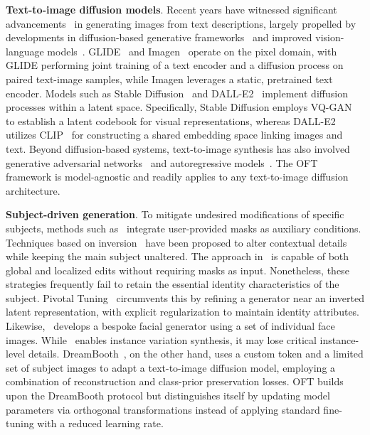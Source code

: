 \textbf{Text-to-image diffusion models}. Recent years have witnessed significant advancements~\cite{saharia2022photorealistic,ramesh2022hierarchical,rombach2022high,gu2022vector,nichol2022glide} in generating images from text descriptions, largely propelled by developments in diffusion-based generative frameworks~\cite{ho2020denoising,song2021score,song2021denoising,dhariwal2021diffusion} and improved vision-language models~\cite{su2020vlbert,lu2019vilbert,radford2021learning,wang2021simvlm,li2022blip,li2023blip,alayrac2022flamingo,schuhmann2022laion}. GLIDE~\cite{nichol2022glide} and Imagen~\cite{saharia2022photorealistic} operate on the pixel domain, with GLIDE performing joint training of a text encoder and a diffusion process on paired text-image samples, while Imagen leverages a static, pretrained text encoder. Models such as Stable Diffusion~\cite{rombach2022high} and DALL-E2~\cite{ramesh2022hierarchical} implement diffusion processes within a latent space. Specifically, Stable Diffusion employs VQ-GAN~\cite{esser2021taming} to establish a latent codebook for visual representations, whereas DALL-E2 utilizes CLIP~\cite{radford2021learning} for constructing a shared embedding space linking images and text. Beyond diffusion-based systems, text-to-image synthesis has also involved generative adversarial networks~\cite{reed2016generative,zhang2017stackgan,xu2018attngan,li2019controllable} and autoregressive models~\cite{ramesh2021zero,ding2021cogview,wu2022nuwa,yuscaling}. The OFT framework is model-agnostic and readily applies to any text-to-image diffusion architecture.

\textbf{Subject-driven generation}. To mitigate undesired modifications of specific subjects, methods such as~\cite{avrahami2022blended,nichol2022glide} integrate user-provided masks as auxiliary conditions. Techniques based on inversion~\cite{choi2021ilvr,dhariwal2021diffusion,ramesh2022hierarchical,gal2022image} have been proposed to alter contextual details while keeping the main subject unaltered. The approach in~\cite{hertz2022prompt} is capable of both global and localized edits without requiring masks as input. Nonetheless, these strategies frequently fail to retain the essential identity characteristics of the subject. Pivotal Tuning~\cite{roich2022pivotal} circumvents this by refining a generator near an inverted latent representation, with explicit regularization to maintain identity attributes. Likewise,~\cite{nitzan2022mystyle} develops a bespoke facial generator using a set of individual face images. While~\cite{casanova2021instance} enables instance variation synthesis, it may lose critical instance-level details. DreamBooth~\cite{ruiz2023dreambooth}, on the other hand, uses a custom token and a limited set of subject images to adapt a text-to-image diffusion model, employing a combination of reconstruction and class-prior preservation losses. OFT builds upon the DreamBooth protocol but distinguishes itself by updating model parameters via orthogonal transformations instead of applying standard fine-tuning with a reduced learning rate.

